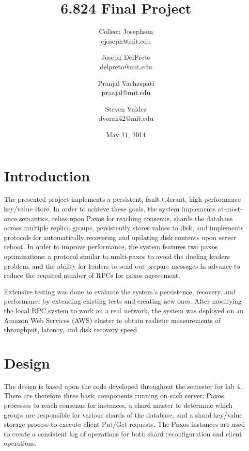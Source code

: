 \documentclass[letterpaper,10pt]{article}
\begin{document}
\title{\Large \bf 6.824 Final Project}
\author{
{\rm Colleen Josephson}\\
cjoseph@mit.edu
\and
{\rm Joseph DelPreto}\\
delpreto@mit.edu
\and
{\rm Pranjal Vachaspati}\\
pranjal@mit.edu
\and
{\rm Steven Valdez}\\
dvorak42@mit.edu
} %

\date{May 11, 2014}

\maketitle


\section{Introduction}
The presented project implements a persistent, fault-tolerant,
high-performance key/value store. In order to achieve these goals, the
system implements at-most-once semantics, relies upon Paxos for
reaching consenus, shards the database across multiple replica groups,
persistently stores values to disk, and implements protocols for
automatically recovering and updating disk contents upon server
reboot.  In order to improve performance, the system features two
paxos optimizations: a protocol similar to multi-paxos to avoid the
dueling leaders problem, and the ability for leaders to send out
prepare messages in advance to reduce the required number of RPCs for
paxos agreeement.

Extensive testing was done to evaluate the system's persistence,
recovery, and performance by extending existing tests and creating new
ones.  After modifying the local RPC system to work on a real network,
the system was deployed on an Amazon Web Services (AWS) cluster to
obtain realistic measurements of throughput, latency, and disk
recovery speed.

\section{Design} \label{sec:design} The design is based upon the code
developed throughout the semester for lab 4.  There are therefore
three basic components running on each server: Paxos processes to
reach consenus for instances, a shard master to determine which groups
are responsible for various shards of the database, and a shard
key/value storage process to execute client Put/Get requests.  The
Paxos instances are used to create a consistent log of operations for
both shard reconfiguration and client operations.
\end{document}
